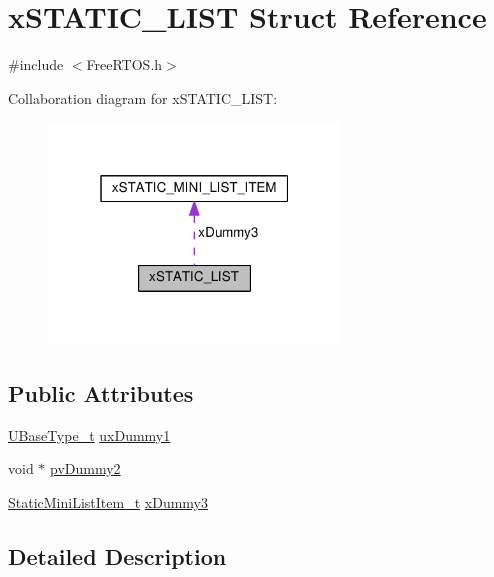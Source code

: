 \hypertarget{structx_s_t_a_t_i_c___l_i_s_t}{}\section{x\+S\+T\+A\+T\+I\+C\+\_\+\+L\+I\+ST Struct Reference}
\label{structx_s_t_a_t_i_c___l_i_s_t}


{\ttfamily \#include $<$Free\+R\+T\+O\+S.\+h$>$}



Collaboration diagram for x\+S\+T\+A\+T\+I\+C\+\_\+\+L\+I\+ST\+:\nopagebreak
\begin{figure}[H]
\begin{center}
\leavevmode
\includegraphics[width=220pt]{structx_s_t_a_t_i_c___l_i_s_t__coll__graph}
\end{center}
\end{figure}
\subsection*{Public Attributes}
\begin{DoxyCompactItemize}
\item 
\hyperlink{portmacro_8h_a646f89d4298e4f5afd522202b11cb2e6}{U\+Base\+Type\+\_\+t} \hyperlink{structx_s_t_a_t_i_c___l_i_s_t_a6d7f720dc21e3a676b885b72a945fea7}{ux\+Dummy1}
\item 
void $\ast$ \hyperlink{structx_s_t_a_t_i_c___l_i_s_t_a681e588716be5f49fe8e9eb73e8f280e}{pv\+Dummy2}
\item 
\hyperlink{_free_r_t_o_s_8h_a9097f48f4dfa56e8e01d9179462c7994}{Static\+Mini\+List\+Item\+\_\+t} \hyperlink{structx_s_t_a_t_i_c___l_i_s_t_a232545ebb5629617e0ee6ba286e37788}{x\+Dummy3}
\end{DoxyCompactItemize}


\subsection{Detailed Description}


